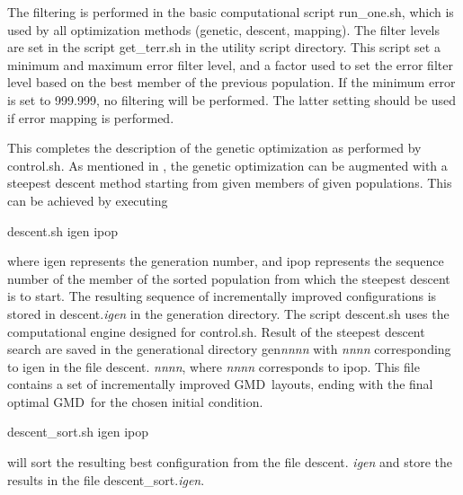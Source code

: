 \documentclass[12pt]{article}
\newcommand{\gmd}{GMD}
\newcommand{\file}{\sf}
\begin{document}
The filtering is performed in the basic computational script {\file
run\_one.sh}, which is used by all optimization methods (genetic, descent,
mapping).  The filter levels are set in the script {\file get\_terr.sh} in the
utility script directory. This script set a minimum and maximum error filter
level, and a factor used to set the error filter level based on the best
member of the previous population. If the minimum error is set to 999.999, no
filtering will be performed. The latter setting should be used if error
mapping is performed.


\vspace{\baselineskip}
\noindent 
This completes the description of the genetic optimization as performed by
{\file control.sh}. As mentioned in \cite{tol:MMABmanual}, the genetic
optimization can be augmented with a steepest descent method starting from
given members of given populations. This can be achieved by executing
\begin{center}
{\file descent.sh igen ipop}
\end{center}
\noindent
where {\file igen} represents the generation number, and {\file ipop}
represents the sequence number of the member of the sorted population from
which the steepest descent is to start. The resulting sequence of
incrementally improved configurations is stored in {\file descent.{\it igen}}
in the generation directory.  The script {\file descent.sh} uses the
computational engine designed for {\file control.sh}. Result of the steepest
descent search are saved in the generational directory {\file gen{\it nnnn}}
with {\it nnnn} corresponding to {\file igen} in the file {\file descent.{\it
nnnn}}, where {\it nnnn} corresponds to {\file ipop}. This file contains a set
of incrementally improved \gmd\ layouts, ending with the final optimal \gmd\
for the chosen initial condition.
\begin{center}
{\file descent\_sort.sh igen ipop}
\end{center}
\noindent
will sort the resulting best configuration from the file {\file descent.{\it
igen}} and store the results in the file {\file descent\_sort.{\it igen}}.
\end{document}
